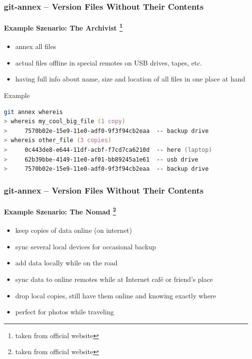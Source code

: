 \documentclass[english,hyperref={pdfpagelabels=false},aspectratio=169]{beamer}
\begin{document}
\begin{frame}[fragile]
  \frametitle{git-annex -- Version Files Without Their Contents}
  \framesubtitle{Example Szenario: The Archivist \footnote{\tiny taken from official website}}
  \begin{itemize}
    \item annex all files
    \item actual files offline in special remotes on USB drives, tapes, etc.
    \item having full info about name, size and location of all files in one place at hand
  \end{itemize}
  
  \begin{block}{Example}
    \vspace{-0.75em}
    \begin{lstlisting}[language=zsh]
git annex whereis
> whereis my_cool_big_file (1 copy)
>     7570b02e-15e9-11e0-adf0-9f3f94cb2eaa  -- backup drive
> whereis other_file (3 copies)
>     0c443de8-e644-11df-acbf-f7cd7ca6210d  -- here (laptop)
>     62b39bbe-4149-11e0-af01-bb89245a1e61  -- usb drive
>     7570b02e-15e9-11e0-adf0-9f3f94cb2eaa  -- backup drive
    \end{lstlisting}
    \vspace{-0.75em}
  \end{block}
\end{frame}

\begin{frame}
  \frametitle{git-annex -- Version Files Without Their Contents}
  \framesubtitle{Example Szenario: The Nomad \footnote{\tiny taken from official website}}
  \begin{itemize}
    \item keep copies of data online (on internet)
    \item sync several local devices for occasional backup
    \item add data locally while on the road
    \item sync data to online remotes while at Internet café or friend's place
    \item drop local copies, still have them online and knowing exactly where
    \item perfect for photos while traveling
  \end{itemize}
\end{frame}



\end{document}
